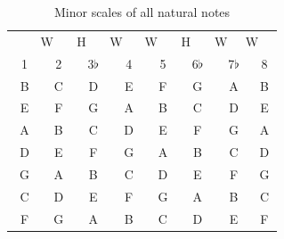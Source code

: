 \begin{table}[h]
	\centering
	\begin{tabular}{*{16}{c}}
		& \multicolumn{2}{P{4mm}}{\large{W}} & \multicolumn{2}{P{4mm}}{\large{H}} & \multicolumn{2}{P{4mm}}{\large{W}} & \multicolumn{2}{P{4mm}}{\large{W}} & \multicolumn{2}{P{4mm}}{\large{H}} & \multicolumn{2}{P{4mm}}{\large{W}} & \multicolumn{2}{P{4mm}}{\large{W}} & \\
		\multicolumn{2}{P{4mm}}{1} & \multicolumn{2}{P{4mm}}{2} & \multicolumn{2}{P{4mm}}{3$\flat$} & \multicolumn{2}{P{4mm}}{4} & \multicolumn{2}{P{4mm}}{5} & \multicolumn{2}{P{4mm}}{6$\flat$} & \multicolumn{2}{P{4mm}}{7$\flat$} & \multicolumn{2}{P{4mm}}{8} \\
		\multicolumn{2}{P{4mm}}{B} & \multicolumn{2}{P{4mm}}{C\sharp} & \multicolumn{2}{P{4mm}}{D} & \multicolumn{2}{P{4mm}}{E} & \multicolumn{2}{P{4mm}}{F\sharp} & \multicolumn{2}{P{4mm}}{G} & \multicolumn{2}{P{4mm}}{A} & \multicolumn{2}{P{4mm}}{B} \\
		\multicolumn{2}{P{4mm}}{E} & \multicolumn{2}{P{4mm}}{F\sharp} & \multicolumn{2}{P{4mm}}{G} & \multicolumn{2}{P{4mm}}{A} & \multicolumn{2}{P{4mm}}{B} & \multicolumn{2}{P{4mm}}{C} & \multicolumn{2}{P{4mm}}{D} & \multicolumn{2}{P{4mm}}{E} \\
		\multicolumn{2}{P{4mm}}{A} & \multicolumn{2}{P{4mm}}{B} & \multicolumn{2}{P{4mm}}{C} & \multicolumn{2}{P{4mm}}{D} & \multicolumn{2}{P{4mm}}{E} & \multicolumn{2}{P{4mm}}{F} & \multicolumn{2}{P{4mm}}{G} & \multicolumn{2}{P{4mm}}{A} \\
		\multicolumn{2}{P{4mm}}{D} & \multicolumn{2}{P{4mm}}{E} & \multicolumn{2}{P{4mm}}{F} & \multicolumn{2}{P{4mm}}{G} & \multicolumn{2}{P{4mm}}{A} & \multicolumn{2}{P{4mm}}{B\flat} & \multicolumn{2}{P{4mm}}{C} & \multicolumn{2}{P{4mm}}{D} \\
		\multicolumn{2}{P{4mm}}{G} & \multicolumn{2}{P{4mm}}{A} & \multicolumn{2}{P{4mm}}{B\flat} & \multicolumn{2}{P{4mm}}{C} & \multicolumn{2}{P{4mm}}{D} & \multicolumn{2}{P{4mm}}{E\flat} & \multicolumn{2}{P{4mm}}{F} & \multicolumn{2}{P{4mm}}{G} \\
		\multicolumn{2}{P{4mm}}{C} & \multicolumn{2}{P{4mm}}{D} & \multicolumn{2}{P{4mm}}{E\flat} & \multicolumn{2}{P{4mm}}{F} & \multicolumn{2}{P{4mm}}{G} & \multicolumn{2}{P{4mm}}{A\flat} & \multicolumn{2}{P{4mm}}{B\flat} & \multicolumn{2}{P{4mm}}{C} \\
		\multicolumn{2}{P{4mm}}{F} & \multicolumn{2}{P{4mm}}{G} & \multicolumn{2}{P{4mm}}{A\flat} & \multicolumn{2}{P{4mm}}{B\flat} & \multicolumn{2}{P{4mm}}{C} & \multicolumn{2}{P{4mm}}{D\flat} & \multicolumn{2}{P{4mm}}{E\flat} & \multicolumn{2}{P{4mm}}{F}
	\end{tabular}
	\caption{Minor scales of all natural notes}
	\label{tab:guitar_natural_note_minor_scale}
\end{table}

